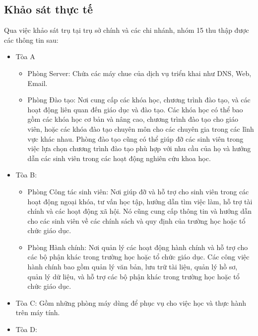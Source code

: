 \documentclass[12pt, a4paper]{article}
\begin{document}
	\subsection{Khảo sát thực tế}
	\begin{flushleft}
		\hspace{1.5cm} Qua việc khảo sát trụ tại trụ sở chính và các chi nhánh, nhóm 15 thu thập được các thông tin sau:
		\begin{itemize}[leftmargin=1.7cm, itemsep=0pt, topsep=0pt]
			\item Tòa A 
			\begin{itemize}[leftmargin=1cm, itemsep=0pt, topsep=0pt]
				\item Phòng Server: Chứa các máy chue của dịch vụ triển khai như DNS, Web, Email.\\
				\item Phòng Đào tạo: Nơi cung cấp các khóa học, chương trình đào tạo, và các hoạt động liên quan đến giáo dục và đào tạo. Các khóa học có thể bao gồm các khóa học cơ bản và nâng cao, chương trình đào tạo cho giáo viên, hoặc các khóa đào tạo chuyên môn cho các chuyên gia trong các lĩnh vực khác nhau. Phòng đào tạo cũng có thể giúp đỡ các sinh viên trong việc lựa chọn chương trình đào tạo phù hợp với nhu cầu của họ và hướng dẫn các sinh viên trong các hoạt động nghiên cứu khoa học. \
			\end{itemize}
			\item Tòa B:
			\begin{itemize}[leftmargin=1cm, itemsep=0pt, topsep=0pt]
				\item Phòng Công tác sinh viên: Nơi giúp đỡ và hỗ trợ cho sinh viên trong các hoạt động ngoại khóa, tư vấn học tập, hướng dẫn tìm việc làm, hỗ trợ tài chính và các hoạt động xã hội. Nó cũng cung cấp thông tin và hướng dẫn cho các sinh viên về các chính sách và quy định của trường học hoặc tổ chức giáo dục. \\
				\item Phòng Hành chính: Nơi quản lý các hoạt động hành chính và hỗ trợ cho các bộ phận khác trong trường học hoặc tổ chức giáo dục. Các công việc hành chính bao gồm quản lý văn bản, lưu trữ tài liệu, quản lý hồ sơ, quản lý dữ liệu, và hỗ trợ các bộ phận khác trong trường học hoặc tổ chức giáo dục. \
			\end{itemize}
			\item Tòa C: Gồm những phòng máy dùng để phục vụ cho việc học và thực hành trên máy tính.
			\item Tòa D:
			\begin{itemize}[leftmargin=1cm, itemsep=0pt, topsep=0pt]

\end{itemize}
\end{itemize}
\end{flushleft}
\end{document}
